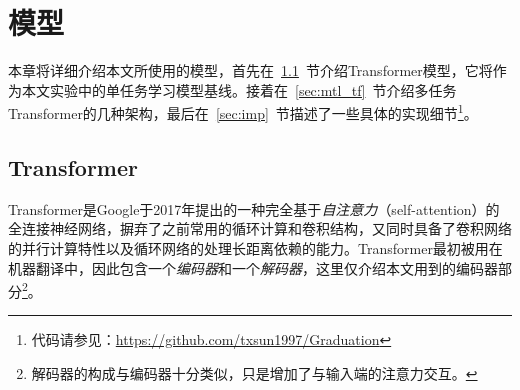 \chapter{模型}
\label{cha:model}
本章将详细介绍本文所使用的模型，首先在~\ref{sec:tf}~节介绍Transformer模型，它将作为本文实验中的单任务学习模型基线。接着在~\ref{sec:mtl_tf}~节介绍多任务Transformer的几种架构，最后在~\ref{sec:imp}~节描述了一些具体的实现细节\footnote{代码请参见：\url{https://github.com/txsun1997/Graduation}}。

\section{Transformer}
\label{sec:tf}
Transformer是Google于2017年提出的一种完全基于\emph{自注意力}（self-attention）的全连接神经网络\cite{DBLP:conf/nips/VaswaniSPUJGKP17}，摒弃了之前常用的循环计算和卷积结构，又同时具备了卷积网络的并行计算特性以及循环网络的处理长距离依赖的能力。Transformer最初被用在机器翻译中，因此包含一个\emph{编码器}和一个\emph{解码器}，这里仅介绍本文用到的编码器部分\footnote{解码器的构成与编码器十分类似，只是增加了与输入端的注意力交互。}。
